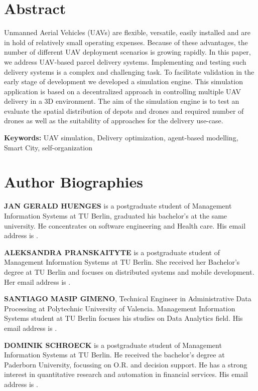 \documentclass{scspaperproc}
\theoremstyle{scsthe}
\begin{document}
\section*{Abstract}
Unmanned Aerial Vehicles (UAVs) are flexible, versatile, easily installed and are in hold of relatively small operating expenses. Because of these advantages, the number of different UAV deployment scenarios is growing rapidly. In this paper, we address UAV-based parcel delivery systems. Implementing and testing such delivery systems is a complex and challenging task. To facilitate validation in the early stage of development we developed a simulation engine. This simulation application is based on a decentralized approach in controlling multiple UAV delivery in a 3D environment. The aim of the simulation engine is to test an evaluate the spatial distribution of depots and drones and required number of drones as well as the suitability of approaches for the delivery use-case.

\textbf{Keywords:} UAV simulation, Delivery optimization, agent-based modelling, Smart City, self-organization






\section*{Author Biographies}

\textbf{\uppercase{Jan Gerald Huenges}} is a postgraduate student of Management Information Systems at TU Berlin, graduated his bachelor's at the same university. He concentrates on software engineering and Health care. His email address is .

\textbf{\uppercase{Aleksandra Pranskaityte}} is a postgraduate student of Management Information Systems at TU Berlin. She received her Bachelor's degree at TU Berlin and focuses on distributed systems and mobile development.  Her email address is .

\textbf{\uppercase{Santiago Masip Gimeno}}, Technical Engineer in Administrative Data Processing at Polytechnic University of Valencia. Management Information Systems student at TU Berlin focuses his studies on Data Analytics field.  His email address is .

\textbf{\uppercase{Dominik Schroeck}} is a postgraduate student of Management Information Systems at TU Berlin. He received the bachelor's degree at Paderborn University, focussing on O.R. and decision support. He has a strong interest in quantitative research and automation in financial services. His email address is .
\end{document}
